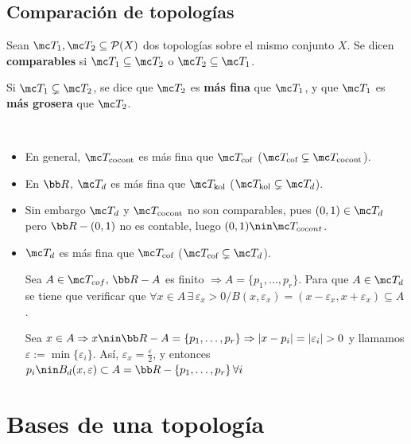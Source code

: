 \subsection{Comparación de topologías}
\begin{defi} Sean \(\mc T_1, \mc T_2 \subseteq \mathcal{P}(X)\) dos topologías sobre el mismo conjunto \(X\). Se dicen \textbf{comparables} si \(\mc T_1 \subseteq \mc T_2\) o \(\mc T_2 \subseteq \mc T_1\).

Si \(\mc T_1 \subsetneq \mc T_2\), se dice que \(\mc T_2\) es \textbf{más fina} que \(\mc T_1\), y que \(\mc T_1\) es \textbf{más grosera} que \(\mc T_2\).
\end{defi}
\begin{ejems} \,
    \begin{itemize}
    \item En general, \(\mc T_{\text{cocont}}\) es más fina que \(\mc T_{\text{cof}}\) ($\mc T_{\text{cof}} \subsetneq \mc T_{\text{cocont}}$).
    \item En $\bb R$, \(\mc T_d\) es más fina que \(\mc T_{\text{kol}}\) ($\mc T_{\text{kol}} \subsetneq \mc T_d$).  
    \item Sin embargo \(\mc T_d\) y \(\mc T_{\text{cocont}}\) no son comparables, pues $(0,1)\in \mc T_d$ pero $\bb R- (0,1)$ no es contable, luego $(0,1) \nin \mc T_{cocont}$.  
    \item \(\mc T_d\) es más fina que \(\mc T_{\text{cof}}\) ($\mc T_{\text{cof}} \subsetneq\mc T_{d}$).
    \begin{dem}
        Sea $A \in \mc T_{cof}, \, \bb R-A$ es finito $\Rightarrow A=\{p_1, \ldots, p_r\}$. Para que $A\in \mc T_d$ se tiene que verificar que $\forall x\in A \, \exists \, \varepsilon_x > 0 / B(x,\varepsilon_x) = (x-\varepsilon_x, x+\varepsilon_x) \subseteq A$. 

        Sea $x \in A\Rightarrow x\nin \bb R-A = \{p_1, \ldots, p_r\} \Rightarrow |x-p_i|=|\varepsilon_i| > 0 $ y llamamos $\varepsilon:= \min \{\varepsilon_i\}$. As\'i, $\varepsilon_x = \frac{\varepsilon}{2}$, y entonces $p_i\nin B_d(x,\varepsilon) \subset A = \bb R - \{p_1, \ldots, p_r\} \, \forall i$
    \end{dem}
    \end{itemize}
\end{ejems}

\section{Bases de una topología}

